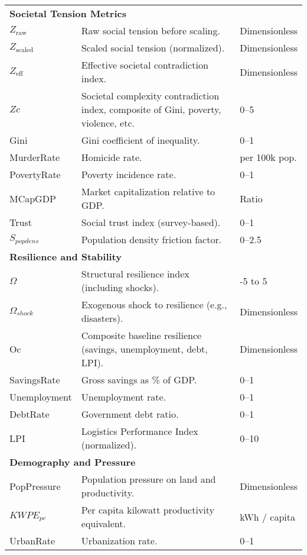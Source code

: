\documentclass{article}
\begin{document}
\begin{longtable}{p{3cm} p{6cm} p{3cm}}
\multicolumn{3}{l}{\textbf{Societal Tension Metrics}} \\
$Z_{\mathrm{raw}}$    & Raw social tension before scaling. & Dimensionless \\
$Z_{\mathrm{scaled}}$ & Scaled social tension (normalized). & Dimensionless \\
$Z_{\mathrm{eff}}$    & Effective societal contradiction index. & Dimensionless \\
$Zc$                  & Societal complexity contradiction index, composite of Gini, poverty, violence, etc. & 0–5 \\
Gini                  & Gini coefficient of inequality. & 0–1 \\
MurderRate            & Homicide rate. & per 100k pop. \\
PovertyRate           & Poverty incidence rate. & 0–1 \\
MCapGDP               & Market capitalization relative to GDP. & Ratio \\
Trust                 & Social trust index (survey-based). & 0–1 \\
$S_{popdens}$         & Population density friction factor. & 0–2.5 \\

\multicolumn{3}{l}{\textbf{Resilience and Stability}} \\
$\Omega$              & Structural resilience index (including shocks). & -5 to 5 \\
$\Omega_{shock}$      & Exogenous shock to resilience (e.g., disasters). & Dimensionless \\
Oc                    & Composite baseline resilience (savings, unemployment, debt, LPI). & Dimensionless \\
SavingsRate           & Gross savings as \% of GDP. & 0–1 \\
Unemployment          & Unemployment rate. & 0–1 \\
DebtRate              & Government debt ratio. & 0–1 \\
LPI                   & Logistics Performance Index (normalized). & 0–10 \\

\multicolumn{3}{l}{\textbf{Demography and Pressure}} \\
PopPressure           & Population pressure on land and productivity. & Dimensionless \\
$KWPE_{pc}$           & Per capita kilowatt productivity equivalent. & kWh / capita \\
UrbanRate             & Urbanization rate. & 0–1 \\


\end{longtable}
\end{document}
